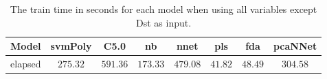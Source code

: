 \begin{table}[!ht]
	\centering
	\begin{tabular}{|c|c|c|c|c|c|c|c|}
		\hline
		Model & svmPoly & C5.0 & nb & nnet & pls & fda & pcaNNet \\ \hline
		elapsed & $275.32$ & $591.36$ & $173.33$ & $479.08$ & $41.82$ & $48.49$ & $304.58$ \\ \hline
	\end{tabular}
	\caption{The train time in seconds for each model when using all variables except Dst as input.}
	\label{tab:time:reverse:noDst:train}
\end{table}
